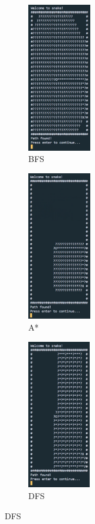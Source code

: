 \documentclass[11pt]{article}
\begin{document}
\begin{figure}[H]
\centering
\begin{subfigure}{0.24\textwidth}
    \includegraphics[height=6.5cm]{BFS_Path_found} 
    \caption{BFS}
    \label{fig:subim1}
\end{subfigure}
\begin{subfigure}{0.24\textwidth}
    \includegraphics[height=6.5cm]{A_Star_Path_Found}
    \caption{A*}
    \label{fig:subim2}
\end{subfigure}
\begin{subfigure}{0.24\textwidth}
    \includegraphics[height=6.5cm]{DFS_Path_Found}
    \caption{DFS}
    \label{fig:subim3}
\end{subfigure}

\end{figure}
\end{document}
